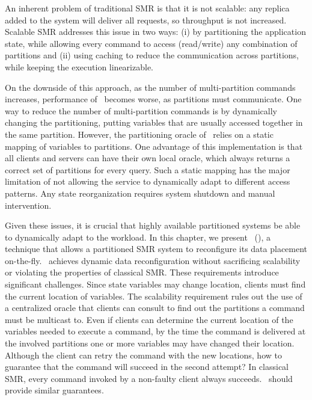 
An inherent problem of traditional SMR is that it is not scalable: any replica
added to the system will deliver all requests, so throughput is not increased.
Scalable SMR addresses this issue in two ways: (i) by partitioning the
application state, while allowing every command to access (read/write) any
combination of partitions and (ii) using caching to reduce the communication
across partitions, while keeping the execution linearizable.

On the downside of this approach, as the number of multi-partition commands
increases, performance of \ssmr\ becomes worse, as partitions must communicate.
One way to reduce the number of multi-partition commands is by dynamically
changing the partitioning, putting variables that are usually accessed together
in the same partition. However, the partitioning oracle of \ssmr\ relies on a
static mapping of variables to partitions. One advantage of this implementation
is that all clients and servers can have their own local oracle, which always
returns a correct set of partitions for every query. Such a static mapping has
the major limitation of not allowing the service to dynamically adapt to
different access patterns. Any state reorganization requires system shutdown and
manual intervention.

Given these issues, it is crucial that highly available partitioned systems be
able to dynamically adapt to the workload. In this chapter, we present
\dssmrlong\ (\dssmr), a technique that allows a partitioned SMR system to
reconfigure its data placement on-the-fly. \dssmr\ achieves dynamic data
reconfiguration without sacrificing scalability or violating the properties of
classical SMR. These requirements introduce significant challenges. Since state
variables may change location, clients must find the current location of
variables. The scalability requirement rules out the use of a centralized oracle
that clients can consult to find out the partitions a command must be multicast
to. Even if clients can determine the current location of the variables needed
to execute a command, by the time the command is delivered at the involved
partitions one or more variables may have changed their location. Although the
client can retry the command with the new locations, how to guarantee that the
command will succeed in the second attempt? In classical SMR, every command
invoked by a non-faulty client always succeeds. \dssmr\ should provide similar
guarantees.

